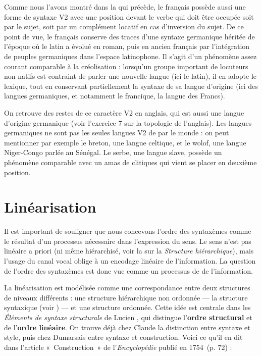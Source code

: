 {    Comme nous l’avons montré dans la  qui précède, le français possède aussi une forme de syntaxe V2 avec une position devant le verbe qui doit être occupée soit par le sujet, soit par un complément locatif en cas d’inversion du sujet. De ce point de vue, le français conserve des traces d’une syntaxe germanique héritée de l’époque où le latin a évolué en roman, puis en ancien français par l’intégration de peuples germaniques dans l’espace latinophone. Il s’agit d’un phénomène assez courant comparable à la créolisation : lorsqu’un groupe important de locuteurs non natifs est contraint de parler une nouvelle langue (ici le latin), il en adopte le lexique, tout en conservant partiellement la syntaxe de sa langue d’origine (ici des langues germaniques, et notamment le francique, la langue des Francs).

    On retrouve des restes de ce caractère V2 en anglais, qui est aussi une langue d’origine germanique (voir l’exercice 7 sur la topologie de l’anglais). Les langues germaniques ne sont pas les seules langues V2 de par le monde : on peut mentionner par exemple le breton, une langue celtique, et le wolof, une langue Niger-Congo parlée au Sénégal. Le serbe, une langue slave, possède un phénomène comparable avec un amas de clitiques qui vient se placer en deuxième position.
}
\section{Linéarisation}\label{sec:3.5.6}

Il est important de souligner que nous concevons l’ordre des syntaxèmes comme le résultat d’un processus nécessaire dans l’expression du sens. Le sens n’est pas linéaire a priori (ni même hiérarchisé, voir la  sur la \textit{Structure hiérarchique}), mais l’usage du canal vocal oblige à un encodage linéaire de l’information. La question de l’ordre des syntaxèmes est donc vue comme un processus de  de l’information.

La linéarisation est modélisée comme une correspondance entre deux structures de niveaux différents : une structure hiérarchique non ordonnée — la structure syntaxique (voir ) — et une structure ordonnée. Cette idée est centrale dans les \textit{Éléments de syntaxe structurale} de Lucien \citet{Tesnière1959}, qui distingue l’\textbf{ordre structural} et de l’\textbf{ordre linéaire}. On trouve déjà chez Claude \citet{Buffier1709} la distinction entre syntaxe et style, puis chez Dumarsais entre syntaxe et construction. Voici ce qu’il en dit dans l’article «~Construction~» de l’\textit{Encyclopédie} publié en 1754~(p. 72) :

